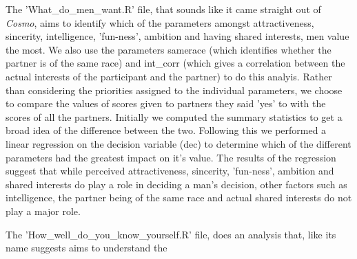 \documentclass{article}
\begin{document}
The 'What_do_men_want.R' file, that sounds like it came straight out of \textit{Cosmo}, aims to identify which of the parameters amongst attractiveness, sincerity, intelligence, 'fun-ness', ambition and having shared interests, men value the most. We also use the parameters samerace (which identifies whether the partner is of the same race) and int_corr (which gives a correlation between the actual interests of the participant and the partner) to do this analyis. Rather than considering the priorities assigned to the individual parameters, we choose to compare the values of scores given to partners they said 'yes' to with the scores of all the partners. Initially we computed the summary statistics to get a broad idea of the difference between the two. Following this we performed a linear regression on the decision variable (dec) to determine which of the different parameters had the greatest impact on it's value. The results of the regression suggest that while perceived attractiveness, sincerity, 'fun-ness', ambition and shared interests do play a role in deciding a man's decision, other factors such as intelligence, the partner being of the same race and actual shared interests do not play a major role.

The 'How_well_do_you_know_yourself.R' file, does an analysis that, like its name suggests aims to understand the 
\end{document}
